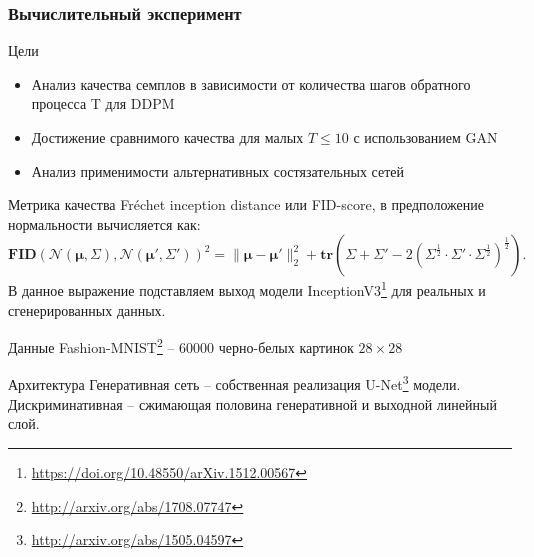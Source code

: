 \documentclass[8pt]{beamer}
\begin{document}
\begin{frame}
\frametitle{Вычислительный эксперимент}
	\begin{block}{Цели}
		\begin{itemize}
			\item Анализ качества семплов в зависимости от количества шагов обратного процесса T для DDPM 		
			\item Достижение сравнимого качества для малых $T \leqslant 10$ с использованием GAN
			\item Анализ применимости альтернативных состязательных сетей
		\end{itemize}		
	\end{block}
	\begin{block}{Метрика качества}
		Fréchet inception distance или FID-score, в предположение нормальности вычисляется как:
			 \begin{equation*}
				\textbf{FID}({\mathcal {N}}(\mathbf{\mu},\Sigma),{\mathcal {N}}(\mathbf{\mu} ',\Sigma '))^{2}=\lVert \mathbf{\mu} -\mathbf{\mu} '\rVert _{2}^{2}+\textbf{tr} \left(\Sigma +\Sigma '-2\left(\Sigma ^{\frac {1}{2}}\cdot \Sigma '\cdot \Sigma ^{\frac {1}{2}}\right)^{\frac {1}{2}}\right).
			\end{equation*}
		В данное выражение подставляем выход модели InceptionV3\footnote{\url{https://doi.org/10.48550/arXiv.1512.00567}} для реальных и сгенерированных данных.
	\end{block}
	\begin{block}{Данные}
		Fashion-MNIST\footnote{\url{http://arxiv.org/abs/1708.07747}} -- 60000 черно-белых картинок $28\times28$
	\end{block}
	\begin{block}{Архитектура}
		Генеративная сеть -- собственная реализация U-Net\footnote{\url{http://arxiv.org/abs/1505.04597}} модели.\\
		 Дискриминативная -- сжимающая половина генеративной и выходной линейный слой.
	\end{block}
\end{frame}
\end{document}

